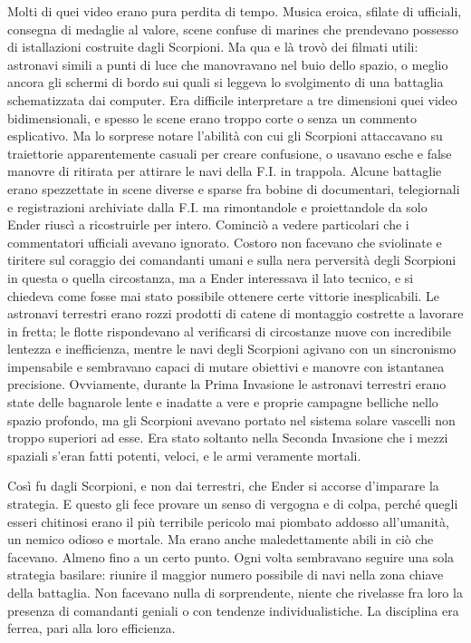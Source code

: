 {Molti di quei video erano pura perdita di tempo. Musica eroica, sfilate
	di ufficiali, consegna di medaglie al valore, scene confuse di marines
	che prendevano possesso di istallazioni costruite dagli Scorpioni. Ma
	qua e là trovò dei filmati utili: astronavi simili a punti di luce che
	manovravano nel buio dello spazio, o meglio ancora gli schermi di bordo
	sui quali si leggeva lo svolgimento di una battaglia schematizzata dai
	computer. Era difficile interpretare a tre dimensioni quei video
	bidimensionali, e spesso le scene erano troppo corte o senza un commento
	esplicativo. Ma lo sorprese notare l'abilità con cui gli Scorpioni
	attaccavano su traiettorie apparentemente casuali per creare confusione,
	o usavano esche e false manovre di ritirata per attirare le navi della
	F.I. in trappola. Alcune battaglie erano spezzettate in scene diverse e
	sparse fra bobine di documentari, telegiornali e registrazioni
	archiviate dalla F.I. ma rimontandole e proiettandole da solo Ender
	riuscì a ricostruirle per intero. Cominciò a vedere particolari che i
	commentatori ufficiali avevano ignorato. Costoro non facevano che
	sviolinate e tiritere sul coraggio dei comandanti umani e sulla nera
	perversità degli Scorpioni in questa o quella circostanza, ma a Ender
	interessava il lato tecnico, e si chiedeva come fosse mai stato
	possibile ottenere certe vittorie inesplicabili. Le astronavi terrestri
	erano rozzi prodotti di catene di montaggio costrette a lavorare in
	fretta; le flotte rispondevano al verificarsi di circostanze nuove con
	incredibile lentezza e inefficienza, mentre le navi degli Scorpioni
	agivano con un sincronismo impensabile e sembravano capaci di mutare
	obiettivi e manovre con istantanea precisione. Ovviamente, durante la
	Prima Invasione le astronavi terrestri erano state delle bagnarole lente
	e inadatte a vere e proprie campagne belliche nello spazio profondo, ma
	gli Scorpioni avevano portato nel sistema solare vascelli non troppo
	superiori ad esse. Era stato soltanto nella Seconda Invasione che i
	mezzi spaziali s'eran fatti potenti, veloci, e le armi veramente
	mortali.}

{Così fu dagli Scorpioni, e non dai terrestri, che Ender si accorse
	d'imparare la strategia. E questo gli fece provare un senso di vergogna
	e di colpa, perché quegli esseri chitinosi erano il più terribile
	pericolo mai piombato addosso all'umanità, un nemico odioso e mortale.
	Ma erano anche maledettamente abili in ciò che facevano. Almeno fino a
	un certo punto. Ogni volta sembravano seguire una sola strategia
	basilare: riunire il maggior numero possibile di navi nella zona chiave
	della battaglia. Non facevano nulla di sorprendente, niente che
	rivelasse fra loro la presenza di comandanti geniali o con tendenze
	individualistiche. La disciplina era ferrea, pari alla loro efficienza.}

